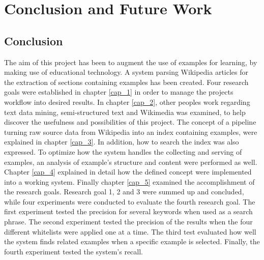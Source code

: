 
\chapter{Conclusion and Future Work}


\section{Conclusion}

The aim of this project has been to augment the use of examples for learning, by making use of educational technology. A system parsing Wikipedia articles for the extraction of sections containing examples has been created. Four research goals were established in chapter \ref{cap_1} in order to manage the projects workflow into desired results. In chapter \ref{cap_2}, other peoples work regarding text data mining, semi-structured text and Wikimedia was examined, to help discover the usefulness and possibilities of this project. The concept of a pipeline turning raw source data from Wikipedia into an index containing examples, were explained in chapter \ref{cap_3}. In addition, how to search the index was also expressed. To optimize how the system handles the collecting and serving of examples, an analysis of example's structure and content were performed as well. Chapter \ref{cap_4} explained in detail how the defined concept were implemented into a working system. Finally chapter \ref{cap_5} examined the accomplishment of the research goals. Research goal 1, 2 and 3 were summed up and concluded, while four experiments were conducted to evaluate the fourth research goal. The first experiment tested the precision for several keywords when used as a search phrase. The second experiment tested the precision of the results when the four different whitelists were applied one at a time. The third test evaluated how well the system finds related examples when a specific example is selected. Finally, the fourth experiment tested the system's recall.

